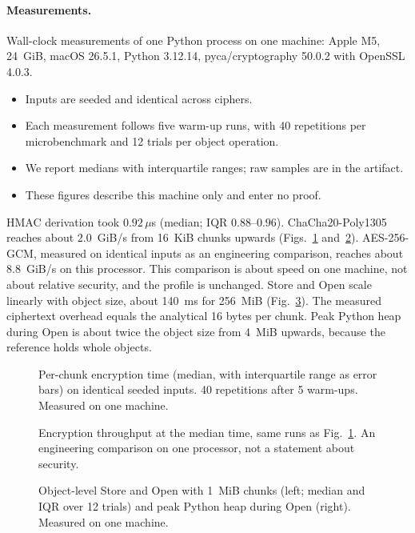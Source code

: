 \documentclass[pdflatex,sn-mathphys-num]{sn-jnl}
\theoremstyle{plain}
\theoremstyle{definition}
\begin{document}
\paragraph{Measurements.}
Wall-clock measurements of one Python process on one machine: Apple M5, 24~GiB, macOS 26.5.1, Python 3.12.14, pyca/cryptography 50.0.2 with OpenSSL 4.0.3.
\begin{itemize}
\item Inputs are seeded and identical across ciphers.
\item Each measurement follows five warm-up runs, with 40 repetitions per microbenchmark and 12 trials per object operation.
\item We report medians with interquartile ranges; raw samples are in the artifact.
\item These figures describe this machine only and enter no proof.
\end{itemize}
HMAC derivation took $0.92\,\mu$s (median; IQR $0.88$--$0.96$). ChaCha20-Poly1305 reaches about $2.0$~GiB/s from 16~KiB chunks upwards (Figs.~\ref{fig:latency} and~\ref{fig:throughput}). AES-256-GCM, measured on identical inputs as an engineering comparison, reaches about $8.8$~GiB/s on this processor. This comparison is about speed on one machine, not about relative security, and the profile is unchanged. Store and Open scale linearly with object size, about 140~ms for 256~MiB (Fig.~\ref{fig:objects}). The measured ciphertext overhead equals the analytical 16 bytes per chunk. Peak Python heap during Open is about twice the object size from 4~MiB upwards, because the reference holds whole objects.

\begin{figure}[htbp]
\centering

\caption{Per-chunk encryption time (median, with interquartile range as error bars) on identical seeded inputs. 40 repetitions after 5 warm-ups. Measured on one machine.}\label{fig:latency}
\end{figure}

\begin{figure}[htbp]
\centering

\caption{Encryption throughput at the median time, same runs as Fig.~\ref{fig:latency}. An engineering comparison on one processor, not a statement about security.}\label{fig:throughput}
\end{figure}

\begin{figure}[t]
\centering

\caption{Object-level Store and Open with 1~MiB chunks (left; median and IQR over 12 trials) and peak Python heap during Open (right). Measured on one machine.}\label{fig:objects}
\end{figure}
\end{document}
